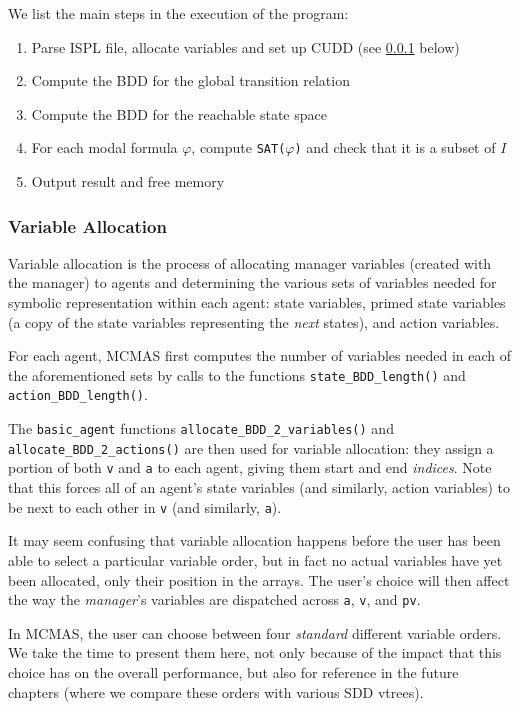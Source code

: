 \documentclass[11pt]{article}
\begin{document}
We list the main steps in the execution of the program:
\begin{enumerate}
\item Parse ISPL file, allocate variables and set up CUDD (see \ref{variable_allocation} below)
\item Compute the BDD for the global transition relation
\item Compute the BDD for the reachable state space 
\item For each modal formula $\varphi$, compute
\texttt{SAT($\varphi$)} and check that it is a subset of $I$
\item Output result and free memory
\end{enumerate}


\subsubsection{Variable Allocation}
\label{variable_allocation}
Variable allocation is the process of allocating manager variables (created with the manager) to agents and determining the various sets of variables needed for symbolic representation within each agent: state variables, primed state variables (a copy of the state variables representing the \textit{next }states), and action variables.

For each agent, MCMAS first computes the number of variables needed in each of the aforementioned sets by calls to the functions \texttt{state\_BDD\_length()} and \texttt{action\_BDD\_length()}.

The \texttt{basic\_agent} functions \texttt{allocate\_BDD\_2\_variables()} and \texttt{allocate\_BDD\_2\_actions()} are then used for variable allocation: they assign a portion of both \texttt{v} and \texttt{a} to each agent, giving them start and end \textit{indices}. Note that this forces all of an agent's state variables (and similarly, action variables) to be next to each other in \texttt{v} (and similarly, \texttt{a}). 

It may seem confusing that variable allocation happens before the user has been able to select a particular variable order, but in fact no actual variables have yet been allocated, only their position in the arrays. The user's choice will then affect the way the \textit{manager}'s variables are dispatched across \texttt{a}, \texttt{v}, and \texttt{pv}. 

In MCMAS, the user can choose between four \textit{standard} different variable orders. We take the time to present them here, not only because of the impact that this choice has on the overall performance, but also for reference in the future chapters (where we compare these orders with various SDD vtrees).
\end{document}
